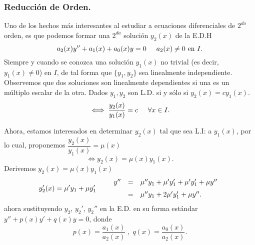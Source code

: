 \documentclass{beamer}
\begin{document}
\frame{\titlepage}

\begin{frame}[t]
	\frametitle{Reducción de Orden.}
	\begin{block}{}
		Uno de los hechos más interesantes al estudiar a ecuaciones diferenciales de \(2^{do}\) orden, es que podemos formar una \(2^{da}\) solución \(y_2(x)\) de la E.D.H
		\[
			a_2(x) y'' +a_1(x) +a_0(x) y =0 \hspace{5mm} a_2(x) \ne 0 \mbox{ en } I.
		\]
		Siempre y cuando se conozca una solución \(y_1(x)\) no trivial (es decir, \(y_1(x) \ne 0\)) en \(I\), de tal forma que \(\{y_1,y_2\}\) sea linealmente independiente. \\[2mm]
		Observemos que dos soluciones son linealmente dependientes si una es un múltiplo escalar de la otra.
		Dados \(y_1,y_2\) son L.D. si y sólo si \(y_2(x) = cy_1(x)\).
		\[
			\iff \dfrac{y_2(x)}{y_1(x)} = c \hspace{5mm} \forall x \in I.
		\]
	\end{block}
\end{frame}

\begin{frame}[t]
	\begin{block}{}
		Ahora, estamos interesados en determinar \(y_2(x)\) tal que sea L.I: a \(y_1(x)\), por lo cual, proponemos \(\dfrac{y_2(x)}{y_1(x)} = \mu (x)\)
		\[
			\iff y_2(x) = \mu (x) y_1(x).
		\]
		Derivemos \(y_2(x) = \mu (x) y_1(x)\)
		\[
			y'_2 (x) = \mu ' y_1+ \mu y_1' \hspace{7mm} 
			\begin{array}{rcl}
				y'' & = & \mu '' y_1+ \mu 'y_1' + \mu 'y_1' + \mu y'' \\[2mm]
				& = & \mu '' y_1+2 \mu 'y_1' + \mu y'' .
			\end{array}
		\]
		ahora sustituyendo \(y_2\), \(y_2'\), \(y_2''\) en la E.D. en su forma estándar \(y'' + p(x) y' + q(x) y =0\), donde
		\[
			p(x) = \dfrac{a_1(x)}{a_2(x)} \;,\; q(x) = \dfrac{a_0(x)}{a_2(x)}.
		\]
	\end{block}
\end{frame}
\end{document}
